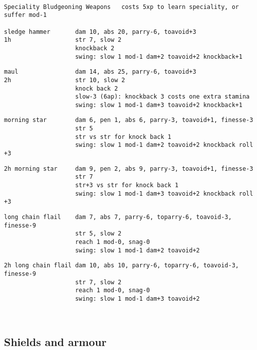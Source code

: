 \

\goodbreak \small \begin{samepage} \begin{verbatim}
Speciality Bludgeoning Weapons   costs 5xp to learn speciality, or suffer mod-1

sledge hammer       dam 10, abs 20, parry-6, toavoid+3
1h                  str 7, slow 2
                    knockback 2
                    swing: slow 1 mod-1 dam+2 toavoid+2 knockback+1
\end{verbatim} \blocklistgap \begin{verbatim}
maul                dam 14, abs 25, parry-6, toavoid+3
2h                  str 10, slow 2
                    knock back 2
                    slow-3 (6ap): knockback 3 costs one extra stamina
                    swing: slow 1 mod-1 dam+3 toavoid+2 knockback+1
\end{verbatim} \blocklistgap \begin{verbatim}
morning star        dam 6, pen 1, abs 6, parry-3, toavoid+1, finesse-3
                    str 5
                    str vs str for knock back 1
                    swing: slow 1 mod-1 dam+2 toavoid+2 knockback roll +3
\end{verbatim} \blocklistgap \begin{verbatim}
2h morning star     dam 9, pen 2, abs 9, parry-3, toavoid+1, finesse-3
                    str 7
                    str+3 vs str for knock back 1
                    swing: slow 1 mod-1 dam+3 toavoid+2 knockback roll +3
\end{verbatim} \blocklistgap \begin{verbatim}
long chain flail    dam 7, abs 7, parry-6, toparry-6, toavoid-3, finesse-9
                    str 5, slow 2
                    reach 1 mod-0, snag-0
                    swing: slow 1 mod-1 dam+2 toavoid+2
\end{verbatim} \blocklistgap \begin{verbatim}
2h long chain flail dam 10, abs 10, parry-6, toparry-6, toavoid-3, finesse-9
                    str 7, slow 2
                    reach 1 mod-0, snag-0
                    swing: slow 1 mod-1 dam+3 toavoid+2
\end{verbatim} \end{samepage} \normalsize \goodbreak

\


\subsection*{Shields and armour}

